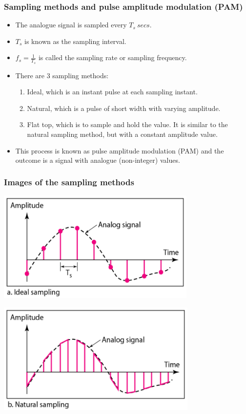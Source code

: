 \documentclass[11pt]{article}
\begin{document}
\subsubsection{Sampling methods and pulse amplitude modulation (PAM)}
\label{sec:org60e48fc}
\begin{itemize}
\item The analogue signal is sampled every \(T_s \ \unit{secs}\).
\item \(T_s\) is known as the sampling interval.
\item \(f_s = \frac{1}{T_s}\) is called the sampling rate or sampling frequency.
\item There are 3 sampling methods:
\begin{enumerate}
\item Ideal, which is an instant pulse at each sampling instant.
\item Natural, which is a pulse of short width with varying amplitude.
\item Flat top, which is to sample and hold the value. It is similar to the natural sampling method, but with a constant amplitude value.
\end{enumerate}
\item This process is known as pulse amplitude modulation (PAM) and the outcome is a signal with analogue (non-integer) values.
\end{itemize}
\subsubsection{Images of the sampling methods}
\label{sec:org14b2ec3}
\begin{center}
\includegraphics[height=15em]{./images/ideal-sampling.png}
\end{center}

\begin{center}
\includegraphics[height=15em]{./images/natural-sampling.png}
\end{center}
\end{document}
